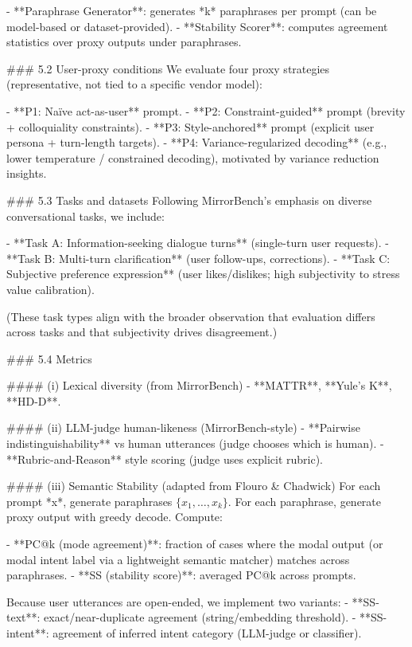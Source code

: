 - **Paraphrase Generator**: generates *k* paraphrases per prompt (can be model-based or dataset-provided).  
- **Stability Scorer**: computes agreement statistics over proxy outputs under paraphrases.

### 5.2 User-proxy conditions  
We evaluate four proxy strategies (representative, not tied to a specific vendor model):

- **P1: Naïve act-as-user** prompt.  
- **P2: Constraint-guided** prompt (brevity + colloquiality constraints).  
- **P3: Style-anchored** prompt (explicit user persona + turn-length targets).  
- **P4: Variance-regularized decoding** (e.g., lower temperature / constrained decoding), motivated by variance reduction insights.

### 5.3 Tasks and datasets  
Following MirrorBench’s emphasis on diverse conversational tasks, we include:

- **Task A: Information-seeking dialogue turns** (single-turn user requests).  
- **Task B: Multi-turn clarification** (user follow-ups, corrections).  
- **Task C: Subjective preference expression** (user likes/dislikes; high subjectivity to stress value calibration).

(These task types align with the broader observation that evaluation differs across tasks and that subjectivity drives disagreement.)

### 5.4 Metrics  

#### (i) Lexical diversity (from MirrorBench)  
- **MATTR**, **Yule’s K**, **HD-D**.

#### (ii) LLM-judge human-likeness (MirrorBench-style)  
- **Pairwise indistinguishability** vs human utterances (judge chooses which is human).  
- **Rubric-and-Reason** style scoring (judge uses explicit rubric).

#### (iii) Semantic Stability (adapted from Flouro & Chadwick)  
For each prompt *x*, generate paraphrases \(\{x_1,\dots,x_k\}\). For each paraphrase, generate proxy output with greedy decode. Compute:

- **PC@k (mode agreement)**: fraction of cases where the modal output (or modal intent label via a lightweight semantic matcher) matches across paraphrases.  
- **SS (stability score)**: averaged PC@k across prompts.

Because user utterances are open-ended, we implement two variants:
- **SS-text**: exact/near-duplicate agreement (string/embedding threshold).  
- **SS-intent**: agreement of inferred intent category (LLM-judge or classifier).

